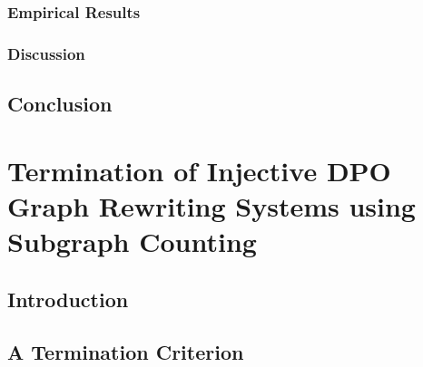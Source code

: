 \documentclass{report}
\begin{document}
\subsection{Empirical Results}
\label{sec:type_graph:result}
 

\subsection{Discussion}
\label{sec:type_graph:related_work}


\section{Conclusion}
\label{sec:type_graph:conclusion}


\chapter{Termination of Injective DPO Graph Rewriting
Systems using Subgraph Counting}
\label{chap:subgraph_counting}
\section{Introduction}
\label{sec:intro}

% 

% 

% 
   
\section{A Termination Criterion} 
\label{sec:termination_criterion}
 
 
\end{document}
